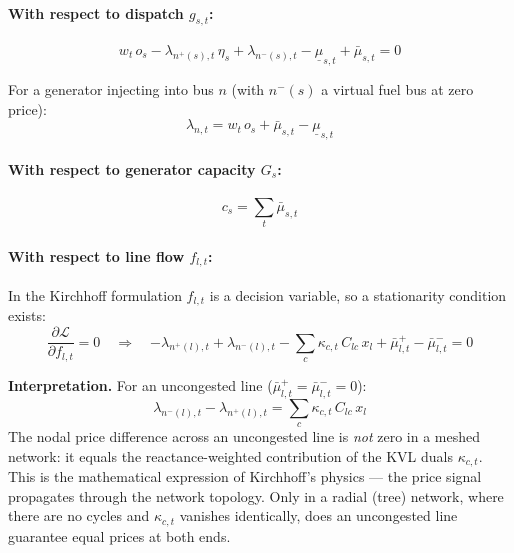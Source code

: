 \documentclass{article}
\begin{document}
\paragraph{With respect to dispatch $g_{s,t}$:}
\begin{equation}
    \boxed{w_t\, o_s - \lambda_{n^+(s),t}\,\eta_s + \lambda_{n^-(s),t}
    - \underline{\mu}_{s,t} + \bar{\mu}_{s,t} = 0}
    \label{eq:stat_dispatch}
\end{equation}

For a generator injecting into bus $n$ (with $n^-(s)$ a virtual fuel bus at zero price):
\begin{equation}
    \lambda_{n,t} = w_t\, o_s + \bar{\mu}_{s,t} - \underline{\mu}_{s,t}
    \label{eq:stat_gen}
\end{equation}

\paragraph{With respect to generator capacity $G_s$:}
\begin{equation}
    \boxed{c_s = \sum_t \bar{\mu}_{s,t}}
    \label{eq:stat_cap_s}
\end{equation}

\paragraph{With respect to line flow $f_{l,t}$:}
In the Kirchhoff formulation $f_{l,t}$ is a decision variable, so a
stationarity condition exists:
\begin{equation}
    \frac{\partial \mathcal{L}}{\partial f_{l,t}} = 0
    \quad \Longrightarrow \quad
    \boxed{
      -\lambda_{n^+(l),t} + \lambda_{n^-(l),t}
      - \sum_c \kappa_{c,t}\, C_{lc}\, x_l
      + \bar{\mu}^+_{l,t} - \bar{\mu}^-_{l,t} = 0
    }
    \label{eq:stat_flow}
\end{equation}

\textbf{Interpretation.}
For an uncongested line ($\bar{\mu}^+_{l,t} = \bar{\mu}^-_{l,t} = 0$):
\begin{equation}
    \lambda_{n^-(l),t} - \lambda_{n^+(l),t}
    = \sum_c \kappa_{c,t}\, C_{lc}\, x_l
    \label{eq:price_diff_kvl}
\end{equation}
The nodal price difference across an uncongested line is \emph{not} zero in
a meshed network: it equals the reactance-weighted contribution of the KVL
duals $\kappa_{c,t}$. This is the mathematical expression of Kirchhoff's
physics --- the price signal propagates through the network topology.
Only in a radial (tree) network, where there are no cycles and $\kappa_{c,t}$
vanishes identically, does an uncongested line guarantee equal prices
at both ends.
\end{document}
